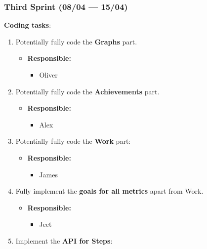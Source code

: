 \documentclass[11pt]{article}
\begin{document}
\hypertarget{third-sprint-0804-1504}{%
\subsubsection{Third Sprint (08/04 ---
15/04)}\label{third-sprint-0804-1504}}

\textbf{Coding tasks}:

\begin{enumerate}
\def\labelenumi{\arabic{enumi}.}
\tightlist
\item
  Potentially fully code the \textbf{Graphs} part.

  \begin{itemize}
  \tightlist
  \item
    \textbf{Responsible:}

    \begin{itemize}
    \tightlist
    \item
      Oliver
    \end{itemize}
  \end{itemize}
\item
  Potentially fully code the \textbf{Achievements} part.

  \begin{itemize}
  \tightlist
  \item
    \textbf{Responsible:}

    \begin{itemize}
    \tightlist
    \item
      Alex
    \end{itemize}
  \end{itemize}
\item
  Potentially fully code the \textbf{Work} part:

  \begin{itemize}
  \tightlist
  \item
    \textbf{Responsible:}

    \begin{itemize}
    \tightlist
    \item
      James
    \end{itemize}
  \end{itemize}
\item
  Fully implement the \textbf{goals for all metrics} apart from Work.

  \begin{itemize}
  \tightlist
  \item
    \textbf{Responsible:}

    \begin{itemize}
    \tightlist
    \item
      Jeet
    \end{itemize}
  \end{itemize}
\item
  Implement the \textbf{API for Steps}:


\end{enumerate}
\end{document}
